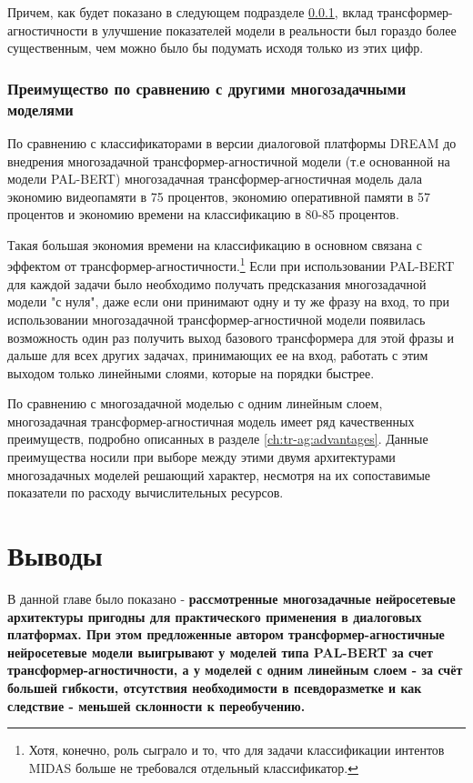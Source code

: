 Причем, как будет показано в следующем подразделе \ref{economy_real}, вклад трансформер-агностичности в улучшение показателей модели в реальности был гораздо более существенным, чем можно было бы подумать исходя только из этих цифр. 

\subsubsection{Преимущество по сравнению с другими многозадачными моделями}
\label{economy_real} 
По сравнению с классификаторами в версии диалоговой платформы {DREAM} до внедрения многозадачной трансформер-агностичной модели (т.е основанной на модели PAL-BERT) многозадачная трансформер-агностичная модель дала экономию видеопамяти в 75 процентов, экономию оперативной памяти в 57 процентов и экономию времени на классификацию в 80-85 процентов.
 
Такая большая экономия времени на классификацию в основном связана с эффектом от трансформер-агностичности.\footnote{Хотя, конечно, роль сыграло и то, что для задачи классификации интентов MIDAS больше не требовался отдельный классификатор.} Если при использовании PAL-BERT для каждой задачи было необходимо получать предсказания многозадачной модели "с нуля", даже если они принимают одну и ту же фразу на вход, то при использовании многозадачной трансформер-агностичной модели появилась возможность один раз получить выход базового трансформера для этой фразы и дальше для всех других задачах, принимающих ее на вход, работать с этим выходом только линейными слоями, которые на порядки быстрее.

По сравнению с многозадачной моделью с одним линейным слоем, многозадачная трансформер-агностичная модель имеет ряд качественных преимуществ, подробно описанных в разделе \ref{ch:tr-ag:advantages}. Данные преимущества носили при выборе между этими двумя архитектурами многозадачных моделей решающий характер, несмотря на их сопоставимые показатели по расходу вычислительных ресурсов.

\section{Выводы}
В данной главе было показано - \textbf{рассмотренные многозадачные нейросетевые архитектуры пригодны для практического применения в диалоговых платформах. При этом предложенные автором трансформер-агностичные нейросетевые модели выигрывают у моделей типа PAL-BERT за счет трансформер-агностичности, а у моделей с одним линейным слоем - за счёт большей гибкости, отсутствия необходимости в псевдоразметке и как следствие - меньшей склонности к переобучению.}



